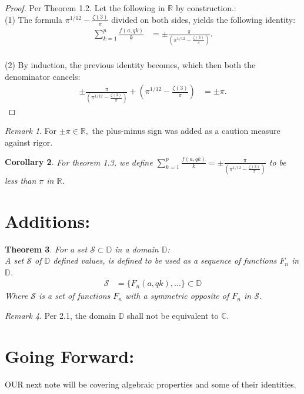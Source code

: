 \documentclass[10pt]{article}
\theoremstyle{plain}
\newtheorem{theorem}{Theorem}[section]
\newtheorem{corollary}[theorem]{Corollary}
\theoremstyle{definition}
\theoremstyle{remark}
\newtheorem{remark}[theorem]{Remark}
\begin{document}
\begin{proof}
Per Theorem 1.2. Let the following in $\mathbb{R}$ by construction.:\\(1) The formula $\pi^{1/12} - \frac{\zeta(3)}{\pi}$ divided on both sides, yields the following identity:
\begin{align*}
	\sum_{k=1}^{p} \frac{f(a, qk)}{k}  &= \pm \frac{\pi}{(\pi^{1/12} - \frac{\zeta(3)}{\pi})}.
\end{align*}\\
(2) By induction, the previous identity becomes, which then both the denominator cancels:
\begin{align*}
	\pm \frac{\pi}{(\pi^{1/12} - \frac{\zeta(3)}{\pi})} + (\pi^{1/12} - \frac{\zeta(3)}{\pi}) &= \pm \pi.
\end{align*}
\end{proof}
\begin{remark}
For $\pm \pi \in \mathbb{R},$ the plus-minus sign was added as a caution measure against rigor.
\end{remark}
\begin{corollary}
For theorem 1.3, we define $\sum_{k=1}^{p} \frac{f(a, qk)}{k} = \pm \frac{\pi}{(\pi^{1/12} - \frac{\zeta(3)}{\pi})}$ to be less than $\pi$ in $\mathbb{R}$.
\end{corollary}

\section{Additions:}

\begin{theorem}
	For a set $\mathcal{S} \subset \mathbb{D}$ in a domain $\mathbb{D}$:\\
	A set $\mathcal{S}$ of $\mathbb{D}$ defined values, is defined to be used as a sequence of functions $F_n$ in $\mathbb{D}$.
	\begin{align*}
		\mathcal{S} &= \{F_n(a, qk), \dots\} \subset \mathbb{D}
	\end{align*}
	Where $\mathcal{S}$ is a set of functions $F_n$ with a symmetric opposite of $F_n$ in $\mathcal{S}$.
\end{theorem}

\begin{remark}
	Per 2.1, the domain $\mathbb{D}$ shall not be equivalent to $\mathbb{C}$.
\end{remark}

\section{Going Forward:}

\lettrine[lines=1, lhang=0.1, loversize=0.2]{O}UR next note will be covering algebraic properties and some of their identities.

\nocite{*}




\end{document}
